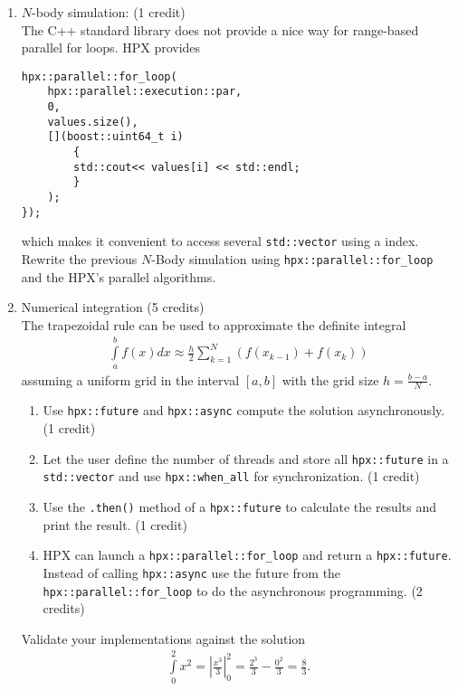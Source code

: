 \documentclass[11pt]{article}
\begin{document}
\begin{enumerate}

\item $N$-body simulation: (1 credit)\\
The C++ standard library does not provide a nice way for range-based parallel for loops. HPX provides
\begin{lstlisting}
hpx::parallel::for_loop(
	hpx::parallel::execution::par, 
	0, 
	values.size(),
	[](boost::uint64_t i)
		{
		std::cout<< values[i] << std::endl;
		}
	);
});
\end{lstlisting} 
which makes it convenient to access several \lstinline|std::vector| using a index. Rewrite the previous $N$-Body simulation using \lstinline|hpx::parallel::for_loop| and the HPX's parallel algorithms.

\item Numerical integration (5 credits)\\
The trapezoidal rule can be used to approximate the definite integral 
\begin{align*}
\int\limits_a^b f(x) dx \approx \frac{h}{2} \sum\limits_{k=1}^N (f(x_{k-1}) + f(x_k))
\end{align*}
assuming a uniform grid in the interval $[a,b]$ with the grid size $h=\frac{b-a}{N}$.
\begin{enumerate}
\item Use \lstinline|hpx::future| and \lstinline|hpx::async| compute the solution asynchronously. (1 credit)
\item Let the user define the number of threads and store all \lstinline|hpx::future| in a \lstinline|std::vector| and use \lstinline|hpx::when_all| for synchronization. (1 credit)
\item Use the \lstinline|.then()| method of a \lstinline|hpx::future| to calculate the results and print the result. (1 credit)
\item HPX can launch a \lstinline|hpx::parallel::for_loop| and return a \lstinline|hpx::future|. Instead of calling \lstinline|hpx::async| use the future from the \lstinline|hpx::parallel::for_loop| to do the asynchronous programming. (2 credits)  
\end{enumerate}
Validate your implementations against the solution 
\begin{align*}
\int\limits_0^2 x^2 = \left\vert \frac{x^3}{3}\right\vert_0^2 = \frac{2^3}{3} - \frac{0^2}{3} = \frac{8}{3}\text{.}
\end{align*}






\end{enumerate}
\doclicenseThis 
\end{document}
